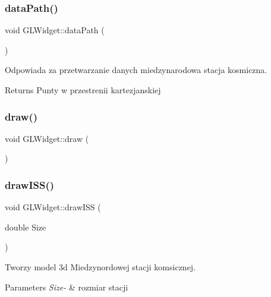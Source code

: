 \subsubsection{\texorpdfstring{data\+Path()}{dataPath()}}
{\footnotesize\ttfamily void G\+L\+Widget\+::data\+Path (\begin{DoxyParamCaption}{ }\end{DoxyParamCaption})}



Odpowiada za przetwarzanie danych miedzynarodowa stacja kosmiczna. 

\begin{DoxyReturn}{Returns}
Punty w przestrenii kartezjanskiej 
\end{DoxyReturn}
\mbox{\label{class_g_l_widget_a1dfee4fc9b3fbebe23b79f31b7da3fca}} 
\subsubsection{\texorpdfstring{draw()}{draw()}}
{\footnotesize\ttfamily void G\+L\+Widget\+::draw (\begin{DoxyParamCaption}{ }\end{DoxyParamCaption})\hspace{0.3cm}{\ttfamily [protected]}}

\mbox{\label{class_g_l_widget_a26a5804fe4acf2830429244ced110852}} 
\subsubsection{\texorpdfstring{draw\+I\+S\+S()}{drawISS()}}
{\footnotesize\ttfamily void G\+L\+Widget\+::draw\+I\+SS (\begin{DoxyParamCaption}\item[{double}]{Size }\end{DoxyParamCaption})}



Tworzy model 3d Miedzynordowej stacji komsicznej. 


\begin{DoxyParams}{Parameters}
{\em Size-\/} & rozmiar stacji \\
\hline
\end{DoxyParams}
\mbox{\label{class_g_l_widget_ac620b32de6bc4f0dc4b3a8961d774234}} 
